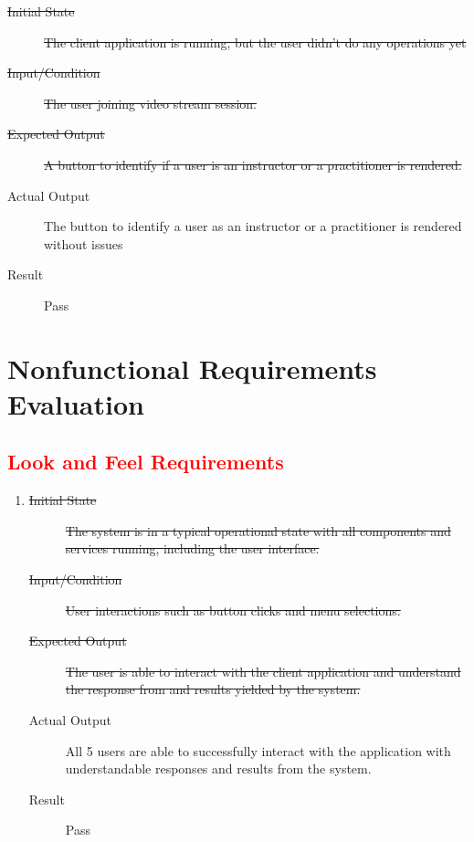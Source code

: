 \documentclass[12pt, titlepage]{article}
\newcommand{\rt}[1]{\textcolor{red}{#1}}
\begin{document}
\begin{enumerate}[FR-T1]
    \begin{description}
    \item[\sout{Initial State}] \sout{The client application is running, but the
        user didn’t do any operations yet}
		\item[\sout{Input/Condition}] \sout{The user joining video stream session.}
		\item[\sout{Expected Output}] \sout{A button to identify if a user is an
        instructor or a practitioner is rendered.}
		\item[Actual Output] The button to identify a user as an instructor or a
      practitioner is rendered without issues
    \item[Result] Pass
    \end{description}
  \end{enumerate}

  \section{Nonfunctional Requirements Evaluation}

  \rt{\subsection{Look and Feel Requirements}}
  \begin{enumerate}[NFR-T1]
    \item \label{NFRT1}
      \begin{description}
      \item[\sout{Initial State}] \sout{The system is in a typical operational
          state with all components and services running, including the user
          interface.}
      \item[\sout{Input/Condition}] \sout{User interactions such as button clicks
          and menu selections.}
      \item[\sout{Expected Output}] \sout{The user is able to interact with the
          client application and understand the response from and results
          yielded by the system.}
      \item[Actual Output] All 5 users are able to successfully interact with the
        application with understandable responses and results from the system.
      \item[Result] Pass
      \end{description}
  \end{enumerate}
\end{document}
